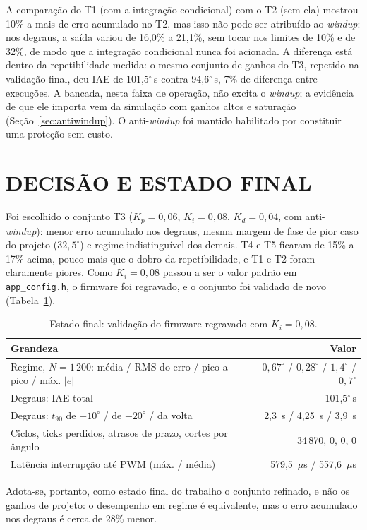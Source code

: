 A comparação do T1 (com a integração condicional) com o T2 (sem ela) mostrou 10\% a mais de erro acumulado no T2, mas isso não pode ser atribuído ao \textit{windup}: nos degraus, a saída variou de 16,0\% a 21,1\%, sem tocar nos limites de 10\% e de 32\%, de modo que a integração condicional nunca foi acionada. A diferença está dentro da repetibilidade medida: o mesmo conjunto de ganhos do T3, repetido na validação final, deu IAE de 101,5$^\circ$\,s contra 94,6$^\circ$\,s, 7\% de diferença entre execuções. A bancada, nesta faixa de operação, não excita o \textit{windup}; a evidência de que ele importa vem da simulação com ganhos altos e saturação (Seção~\ref{sec:antiwindup}). O anti-\textit{windup} foi mantido habilitado por constituir uma proteção sem custo.

\section{DECISÃO E ESTADO FINAL}

Foi escolhido o conjunto T3 ($K_p=0{,}06$, $K_i=0{,}08$, $K_d=0{,}04$, com anti-\textit{windup}): menor erro acumulado nos degraus, mesma margem de fase de pior caso do projeto ($32{,}5^\circ$) e regime indistinguível dos demais. T4 e T5 ficaram de 15\% a 17\% acima, pouco mais que o dobro da repetibilidade, e T1 e T2 foram claramente piores. Como $K_i=0{,}08$ passou a ser o valor padrão em \texttt{app\_config.h}, o firmware foi regravado, e o conjunto foi validado de novo (Tabela~\ref{tab:refino_final}).
\begin{table}[H]
\centering\caption{Estado final: validação do firmware regravado com $K_i=0{,}08$.}\label{tab:refino_final}
\begin{tabularx}{\textwidth}{Xr}
\hline\textbf{Grandeza} & \textbf{Valor}\\\hline
Regime, $N=1\,200$: média / RMS do erro / pico a pico / máx. $|e|$ & $0{,}67^\circ$ / $0{,}28^\circ$ / $1{,}4^\circ$ / $0{,}7^\circ$\\
Degraus: IAE total & 101,5$^\circ$\,s\\
Degraus: $t_{90}$ de $+10^\circ$ / de $-20^\circ$ / da volta & 2,3~s / 4,25~s / 3,9~s\\
Ciclos, ticks perdidos, atrasos de prazo, cortes por ângulo & 34\,870, 0, 0, 0\\
Latência interrupção até PWM (máx. / média) & 579,5~$\mu$s / 557,6~$\mu$s\\\hline
\end{tabularx}
\end{table}
Adota-se, portanto, como estado final do trabalho o conjunto refinado, e não os ganhos de projeto: o desempenho em regime é equivalente, mas o erro acumulado nos degraus é cerca de 28\% menor.
